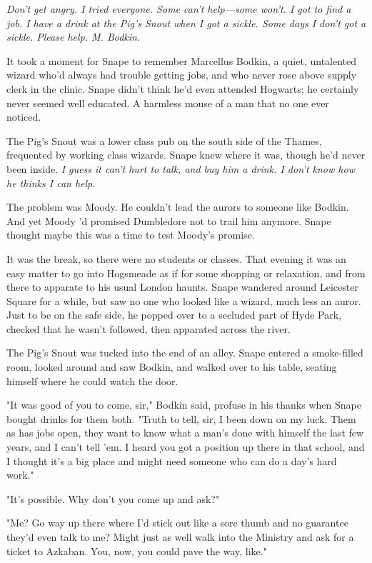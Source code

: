 \emph{Don't get angry. I tried everyone. Some can't help—some won't. I got to find a job. I have a drink at the Pig's Snout when I got a sickle. Some days I don't got a sickle. Please help. M. Bodkin.}

It took a moment for Snape to remember Marcellus Bodkin, a quiet, untalented wizard who'd always had trouble getting jobs, and who never rose above supply clerk in the clinic. Snape didn't think he'd even attended Hogwarts; he certainly never seemed well educated. A harmless mouse of a man that no one ever noticed.

The Pig's Snout was a lower class pub on the south side of the Thames, frequented by working class wizards. Snape knew where it was, though he'd never been inside. \emph{I guess it can't hurt to talk, and buy him a drink. I don't know how he thinks I can help.}

The problem was Moody. He couldn't lead the aurors to someone like Bodkin. And yet Moody 'd promised Dumbledore not to trail him anymore. Snape thought maybe this was a time to test Moody's promise.

It was the break, so there were no students or classes. That evening it was an easy matter to go into Hogsmeade as if for some shopping or relaxation, and from there to apparate to his usual London haunts. Snape wandered around Leicester Square for a while, but saw no one who looked like a wizard, much less an auror. Just to be on the safe side, he popped over to a secluded part of Hyde Park, checked that he wasn't followed, then apparated across the river.

The Pig's Snout was tucked into the end of an alley. Snape entered a smoke-filled room, looked around and saw Bodkin, and walked over to his table, seating himself where he could watch the door.

"It was good of you to come, sir," Bodkin said, profuse in his thanks when Snape bought drinks for them both. "Truth to tell, sir, I been down on my luck. Them as has jobs open, they want to know what a man's done with himself the last few years, and I can't tell 'em. I heard you got a position up there in that school, and I thought it's a big place and might need someone who can do a day's hard work."

"It's possible. Why don't you come up and ask?"

"Me? Go way up there where I'd stick out like a sore thumb and no guarantee they'd even talk to me? Might just as well walk into the Ministry and ask for a ticket to Azkaban. You, now, you could pave the way, like."

